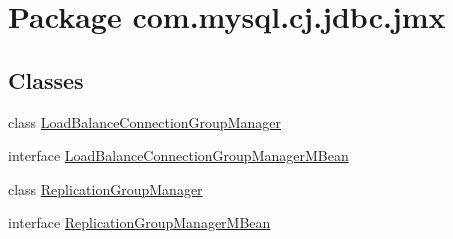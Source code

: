 \hypertarget{namespacecom_1_1mysql_1_1cj_1_1jdbc_1_1jmx}{}\section{Package com.\+mysql.\+cj.\+jdbc.\+jmx}
\label{namespacecom_1_1mysql_1_1cj_1_1jdbc_1_1jmx}
\subsection*{Classes}
\begin{DoxyCompactItemize}
\item 
class \mbox{\hyperlink{classcom_1_1mysql_1_1cj_1_1jdbc_1_1jmx_1_1_load_balance_connection_group_manager}{Load\+Balance\+Connection\+Group\+Manager}}
\item 
interface \mbox{\hyperlink{interfacecom_1_1mysql_1_1cj_1_1jdbc_1_1jmx_1_1_load_balance_connection_group_manager_m_bean}{Load\+Balance\+Connection\+Group\+Manager\+M\+Bean}}
\item 
class \mbox{\hyperlink{classcom_1_1mysql_1_1cj_1_1jdbc_1_1jmx_1_1_replication_group_manager}{Replication\+Group\+Manager}}
\item 
interface \mbox{\hyperlink{interfacecom_1_1mysql_1_1cj_1_1jdbc_1_1jmx_1_1_replication_group_manager_m_bean}{Replication\+Group\+Manager\+M\+Bean}}
\end{DoxyCompactItemize}
